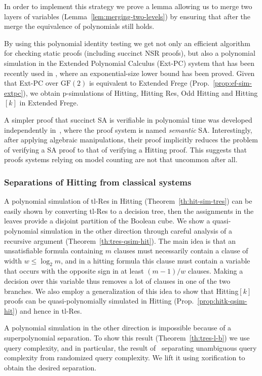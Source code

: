 \documentclass[11pt]{article}
\newcommand{\scterm}[1]{{\textrm{\sc #1}}}
\newcommand{\hit}{\scterm{Hitting}}
\newcommand{\tres}{\scterm{tl-Res}}
\newcommand{\res}{\scterm{Res}}
\newcommand{\F}{\scterm{Frege}}
\newcommand{\EF}{\scterm{Extended {\F}}}
\newcommand{\extpc}{\scterm{Ext-PC}}
\newcommand{\nsr}{\scterm{NSR}}
\newcommand{\sa}{\scterm{SA}}
\newcommand{\hitres}{{\hit} {\res}}
\newcommand{\hitodd}{\scterm{Odd} {\hit}}
\newcommand{\hitk}[1]{\hit$[#1]$}
\newcommand{\GF}{\mathrm{GF}}
\numberwithin{equation}{section}
\begin{document}
In order to implement this strategy
we prove a lemma allowing us to merge two layers of variables (Lemma~\ref{lem:merging-two-levels})
by ensuring that after the merge the equivalence of polynomials still holds.

By using this polynomial identity testing we get not only an efficient algorithm
for checking static proofs (including succinct {\nsr} proofs), 
but also a polynomial simulation in the Extended
Polynomial Calculus ({\extpc}) system that has been recently used in \cite{Ale21},
where an exponential-size lower bound has been proved.
Given that {\extpc} over $\GF(2)$ is equivalent to {\EF} (Prop.~\ref{prop:ef-sim-extpc}),
we obtain p-simulations of {\hit}, {\hitres}, {\hitodd} and {\hitk{k}} in {\EF}.

A simpler proof that succinct {\sa} is verifiable in polynomial time
was developed independently in~\cite{dRPR24}, where the proof system
is named \emph{semantic} {\sa}. Interestingly, after applying
algebraic manipulations, their proof implicitly reduces the problem of
verifying a {\sa} proof to that of verifying a {\hit} proof. This
suggests that proofs systems relying on model counting are not that
uncommon after all.

\subsubsection{Separations of {\hit} from classical systems}
A polynomial simulation of {\tres} in {\hit} (Theorem~\ref{th:hit-sim-tres}) can
be easily shown by converting {\tres} to a decision tree, then the assignments in the leaves provide a disjoint partition of the Boolean cube.
We show a quasi-polynomial simulation in the other direction
through careful analysis
of a recursive argument (Theorem~\ref{th:tres-qsim-hit}).
The main idea is that an unsatisfiable formula containing $m$ clauses must necessarily
contain a clause of width $w \le \log_2 m$, and in a hitting formula this clause must contain a variable
that occurs with the opposite sign in at least $(m-1)/w$ clauses.
Making a decision over this variable thus removes a lot of clauses in one of the two branches.
We also employ a generalization of this idea to show that {\hitk{k}} proofs
can be quasi-polynomially simulated in {\hit} (Prop.~\ref{prop:hitk-qsim-hit}) and hence in {\tres}.

A polynomial simulation in the other direction is impossible because of a superpolynomial separation.
To show this result (Theorem~\ref{th:tres-l-b}) we use query complexity, and in particular,
the result of~\cite{AKK16} separating unambiguous query complexity from randomized query complexity.
We lift it using xorification to obtain the desired separation.
\end{document}
